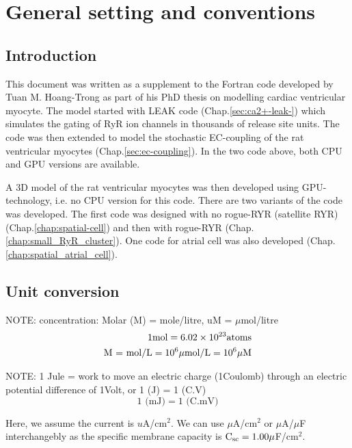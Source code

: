 \chapter{General setting and conventions}
\label{chap:fortran-code-tuan}

\def\Na{{\text{Na}^+}}
\def\Cl{{\text{Cl}^-}}
\def\inj{{\text{inj}}}

\section{Introduction}

This document was written as a supplement to the Fortran code developed by Tuan
M. Hoang-Trong as part of his PhD thesis on modelling cardiac ventricular
myocyte. The model started with LEAK code (Chap.\ref{sec:ca2+-leak-}) which
simulates the gating of RyR ion channels in thousands of release site units.
The code was then extended to model the stochastic EC-coupling of the rat
ventricular myocytes (Chap.\ref{sec:ec-coupling}). In the two code above, both
CPU and GPU versions are available.

A 3D model of the rat ventricular myocytes was then developed using
GPU-technology, i.e. no CPU version for this code. There are two variants of the
code was developed. The first code was designed with no rogue-RYR (satellite
RYR) (Chap.\ref{chap:spatial-cell}) and then with rogue-RYR
(Chap.\ref{chap:small_RyR_cluster}). One code for atrial cell was also developed
(Chap.\ref{chap:spatial_atrial_cell}).

\section{Unit conversion}
\label{sec:unit-conversion}

NOTE: concentration: Molar (M) = mole/litre, uM = $\mu$mol/litre
\begin{eqnarray}
  \label{eq:4}
  1 {\text{mol}} = 6.02 \times 10^{23} \text{atoms} \\
  \text{M = mol/L} = 10^6 \mu \text{mol/L} = 10^6 \mu\text{M}
\end{eqnarray}

NOTE: 1 Jule = work to move an electric charge (1Coulomb) through an
electric potential difference of 1Volt, or 1 (J) = 1 (C.V)
\begin{equation}
  \label{eq:7}
  1\text{ (mJ)} = 1 \text{ (C.mV)}
\end{equation}

Here, we assume the current is $u$A/cm$^2$.
We can use  $\mu$A/cm$^2$ or $\mu$A/$\mu$F interchangebly as the
specific membrane capacity is ${\text{C}_\text{sc}}=1.00\mu$F/cm$^2$.

